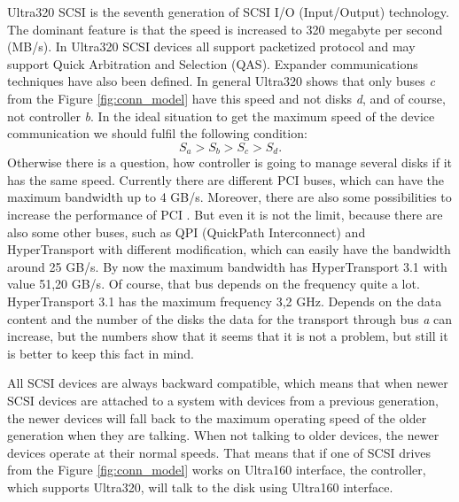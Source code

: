 Ultra320 SCSI \cite{ultra320} is the seventh generation of SCSI I/O (Input/Output) technology. The dominant feature is that the speed is increased to 320 megabyte per second (MB/s). In Ultra320 SCSI devices all support packetized protocol and may support Quick Arbitration and Selection (QAS). Expander communications techniques have also been defined. In general Ultra320 shows that only buses \emph{c} from the Figure \ref{fig:conn_model} have this speed and not disks \emph{d}, and of course, not controller \emph{b}. In the ideal situation to get the maximum speed of the device communication we should fulfil the following condition:
\begin{equation}
	S_a > S_b > S_c > S_d.
\end{equation}
Otherwise there is a question, how controller is going to manage several disks if it has the same speed.
Currently there are different PCI buses, which can have the maximum bandwidth up to 4 GB/s. Moreover, there are also some possibilities to increase the performance of PCI \cite{increase_pci}. But even it is not the limit, because there are also some other buses, such as QPI (QuickPath Interconnect) and HyperTransport with different modification, which can easily have the bandwidth around 25 GB/s. By now the maximum bandwidth has HyperTransport 3.1 with value 51,20 GB/s. Of course, that bus depends on the frequency quite a lot. HyperTransport 3.1 has the maximum frequency 3,2 GHz. Depends on the data content and the number of the disks the data for the transport through bus \emph{a} can increase, but the numbers show that it seems that it is not a problem, but still it is better to keep this fact in mind.



All SCSI devices are always backward compatible, which means that when newer SCSI devices are attached to a system with devices from a previous generation, the newer devices will fall back to the maximum operating speed of the older generation when they are talking. When not talking to older devices, the newer devices operate at their normal speeds. That means that if one of SCSI drives from the Figure \ref{fig:conn_model} works on Ultra160 interface, the controller, which supports Ultra320, will talk to the disk using Ultra160 interface.

